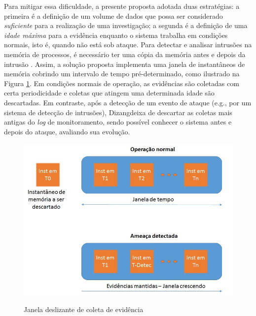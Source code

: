 \documentclass[conference]{IEEEtran}
\newcommand{\marcosR}[1]{{\color{brown}{COMMENT: #1}}}
\newcommand{\fancyname}{Dizang}
\begin{document}
Para mitigar essa dificuldade, a presente proposta adotada duas estratégias: a primeira é a definição de um volume de dados que possa ser considerado \textit{suficiente} para a realização de uma investigação; a segunda é a definição de uma \textit{idade máxima} para a evidência enquanto o sistema trabalha em condições normais, isto é, quando não está sob ataque.
%
Para detectar e analisar intrusões na memória de processos, é necessário ter uma cópia da memória antes e depois da intrusão \cite{Case_Memory_Forensics:2014}. 
%
\marcosR{Er... se você tem ``label'', é para poder usar ``ref''... colocar os números diretamente é jogar fora uma das mais importantes ferramentas do LaTeX...}
Assim, a solução proposta implementa uma janela de instantâneos de memória cobrindo um intervalo de tempo pré-determinado, como ilustrado na Figura \ref{fig:janela}. 
%
Em condições normais de operação, as evidências são coletadas com certa periodicidade e coletas que atingem uma determinada idade são descartadas.
%
Em contraste, após a detecção de um evento de ataque (e.g., por um sistema de detecção de intrusões), \fancyname deixa de descartar as coletas mais antigas do \textit{log} de monitoramento, sendo possível conhecer o sistema antes e depois do ataque, avaliando sua evolução.
%
\marcosR{Não sei por que você está utilizando $\backslash\backslash$ no final das suas frases, mas pare de fazer isso... deixe o LaTeX se virar com a formatação. No final, quando você tiver tudo escrito, aí pode fazer algum sentido se preocupar com formatação, mas não antes disso... - Hamilton: é pra formatação mesmo :-) OK vou deixar o latex se virar}
%

\begin{figure}[htb!]
\caption{Janela deslizante de coleta de evidência}
\includegraphics[scale=0.4]{janela.jpg}
\centering
\label{fig:janela}
\end{figure}
\end{document}
